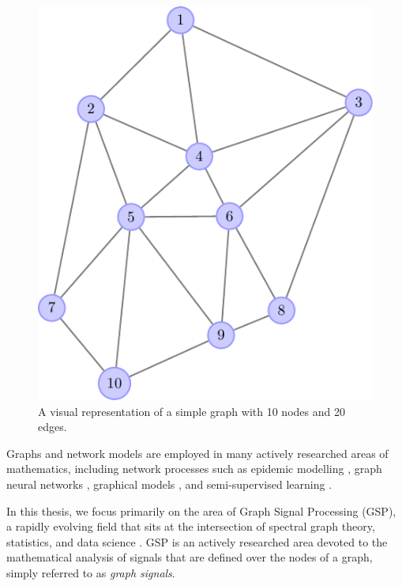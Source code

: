 \begin{figure}
	\centering
		\includegraphics[width=\linewidth]{Figures/graph_plot.pdf}
	\caption[A visual representation of a simple graph]{A visual representation of a simple graph with 10 nodes and 20 edges.}
	\label{fig:basic_graph}
\end{figure}


Graphs and network models are employed in many actively researched areas of mathematics, including network processes such as epidemic modelling \citep{Pare2020}, graph neural networks \citep{Zhou2020}, graphical models \citep{Holmes2008}, and semi-supervised learning \citep{Chong2020}.

\vspace{0.1cm}

In this thesis, we focus primarily on the area of Graph Signal Processing (GSP), a rapidly evolving field that sits at the intersection of spectral graph theory, statistics, and data science \citep{Ortega2018}. GSP is an actively researched area devoted to the mathematical analysis of signals that are defined over the nodes of a graph, simply referred to as \textit{graph signals}. \phantom{In this thesis we are  }


